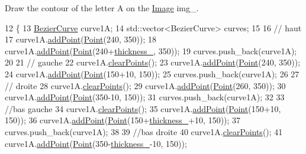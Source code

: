 Draw the contour of the letter A on the \mbox{\hyperlink{class_image}{Image}} img\+\_\+. 


\begin{DoxyCode}
12               \{
13     \mbox{\hyperlink{class_bezier_curve}{BezierCurve}} curve1A;
14     std::vector<BezierCurve> curves;
15 
16     \textcolor{comment}{// haut}
17     curve1A.\mbox{\hyperlink{class_bezier_curve_a38d16c18b36ae45619b05e26e226cf34}{addPoint}}(\mbox{\hyperlink{class_point}{Point}}(240, 350));
18     curve1A.\mbox{\hyperlink{class_bezier_curve_a38d16c18b36ae45619b05e26e226cf34}{addPoint}}(\mbox{\hyperlink{class_point}{Point}}(240+\mbox{\hyperlink{class_font_v1_aed8040e76be9a52833627b92f0fb4e5f}{thickness\_}}, 350));
19     curves.push\_back(curve1A);
20 
21     \textcolor{comment}{// gauche}
22     curve1A.\mbox{\hyperlink{class_bezier_curve_a0ba8ce66d5af5971ae6a1b506029728e}{clearPoints}}();
23     curve1A.\mbox{\hyperlink{class_bezier_curve_a38d16c18b36ae45619b05e26e226cf34}{addPoint}}(\mbox{\hyperlink{class_point}{Point}}(240, 350));
24     curve1A.\mbox{\hyperlink{class_bezier_curve_a38d16c18b36ae45619b05e26e226cf34}{addPoint}}(\mbox{\hyperlink{class_point}{Point}}(150+10, 150));
25     curves.push\_back(curve1A);
26 
27     \textcolor{comment}{// droite}
28     curve1A.\mbox{\hyperlink{class_bezier_curve_a0ba8ce66d5af5971ae6a1b506029728e}{clearPoints}}();
29     curve1A.\mbox{\hyperlink{class_bezier_curve_a38d16c18b36ae45619b05e26e226cf34}{addPoint}}(\mbox{\hyperlink{class_point}{Point}}(260, 350));
30     curve1A.\mbox{\hyperlink{class_bezier_curve_a38d16c18b36ae45619b05e26e226cf34}{addPoint}}(\mbox{\hyperlink{class_point}{Point}}(350-10, 150));
31     curves.push\_back(curve1A);
32 
33     \textcolor{comment}{//bas gauche}
34     curve1A.\mbox{\hyperlink{class_bezier_curve_a0ba8ce66d5af5971ae6a1b506029728e}{clearPoints}}();
35     curve1A.\mbox{\hyperlink{class_bezier_curve_a38d16c18b36ae45619b05e26e226cf34}{addPoint}}(\mbox{\hyperlink{class_point}{Point}}(150+10, 150));
36     curve1A.\mbox{\hyperlink{class_bezier_curve_a38d16c18b36ae45619b05e26e226cf34}{addPoint}}(\mbox{\hyperlink{class_point}{Point}}(150+\mbox{\hyperlink{class_font_v1_aed8040e76be9a52833627b92f0fb4e5f}{thickness\_}}+10, 150));
37     curves.push\_back(curve1A);
38 
39     \textcolor{comment}{//bas droite}
40     curve1A.\mbox{\hyperlink{class_bezier_curve_a0ba8ce66d5af5971ae6a1b506029728e}{clearPoints}}();
41     curve1A.\mbox{\hyperlink{class_bezier_curve_a38d16c18b36ae45619b05e26e226cf34}{addPoint}}(\mbox{\hyperlink{class_point}{Point}}(350-\mbox{\hyperlink{class_font_v1_aed8040e76be9a52833627b92f0fb4e5f}{thickness\_}}-10, 150));

\end{DoxyCode}
